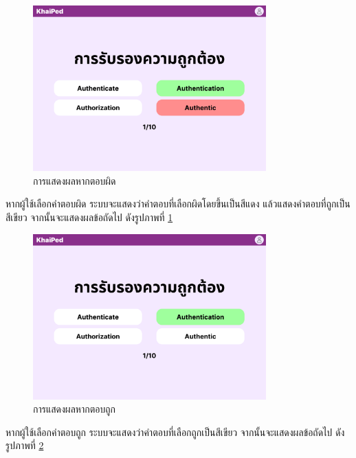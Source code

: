 \documentclass[12pt,oneside,openright,a4paper]{cpe-thai-project}
\begin{document}
\pagebreak
\begin{figure}[!h]\centering
	\includegraphics[width=0.8\textwidth, keepaspectratio=true]{image/chap3/ui/quiz/Quiz - Wrong Answer.png}
	\caption{การแสดงผลหากตอบผิด}\label{fig:UI_QuizWrong}
\end{figure}
\hspace{1cm}
หากผู้ใช้เลือกคำตอบผิด ระบบจะแสดงว่าคำตอบที่เลือกผิดโดยขึ้นเป็นสีแดง แล้วแสดงคำตอบที่ถูกเป็นสีเขียว จากนั้นจะแสดงผลข้อถัดไป ดังรูปภาพที่ \ref{fig:UI_QuizWrong}

\begin{figure}[!h]\centering
	\includegraphics[width=0.8\textwidth, keepaspectratio=true]{image/chap3/ui/quiz/Quiz - Correct Answer.png}
	\caption{การแสดงผลหากตอบถูก}\label{fig:UI_QuizCorrect}
\end{figure}
\hspace{1cm}
หากผู้ใช้เลือกคำตอบถูก ระบบจะแสดงว่าคำตอบที่เลือกถูกเป็นสีเขียว จากนั้นจะแสดงผลข้อถัดไป ดังรูปภาพที่ \ref{fig:UI_QuizCorrect}
\end{document}

